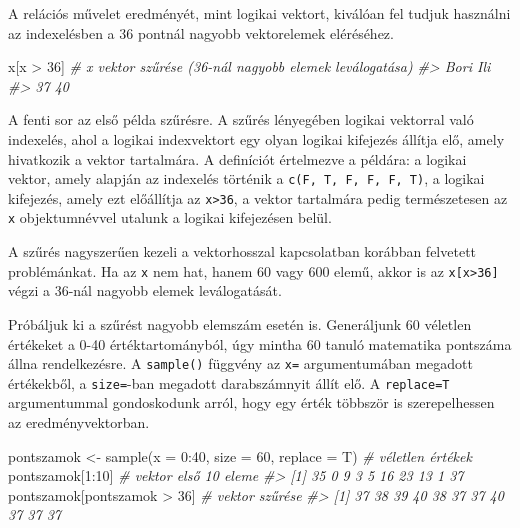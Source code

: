 \documentclass[
]{book}
\newenvironment{Shaded}{\begin{snugshade}}{\end{snugshade}}
\newcommand{\AttributeTok}[1]{\textcolor[rgb]{0.77,0.63,0.00}{#1}}
\newcommand{\CommentTok}[1]{\textcolor[rgb]{0.56,0.35,0.01}{\textit{#1}}}
\newcommand{\DecValTok}[1]{\textcolor[rgb]{0.00,0.00,0.81}{#1}}
\newcommand{\FunctionTok}[1]{\textcolor[rgb]{0.00,0.00,0.00}{#1}}
\newcommand{\NormalTok}[1]{#1}
\newcommand{\OtherTok}[1]{\textcolor[rgb]{0.56,0.35,0.01}{#1}}
\newcommand{\SpecialCharTok}[1]{\textcolor[rgb]{0.00,0.00,0.00}{#1}}
\begin{document}
A relációs művelet eredményét, mint logikai vektort, kiválóan fel tudjuk használni az indexelésben a 36 pontnál nagyobb vektorelemek eléréséhez.

\begin{Shaded}
\begin{Highlighting}[]
\NormalTok{x[x }\SpecialCharTok{\textgreater{}} \DecValTok{36}\NormalTok{]       }\CommentTok{\# x vektor szűrése (36{-}nál nagyobb elemek leválogatása)}
\CommentTok{\#\textgreater{} Bori  Ili }
\CommentTok{\#\textgreater{}   37   40}
\end{Highlighting}
\end{Shaded}

A fenti sor az első példa szűrésre. A szűrés lényegében logikai vektorral való indexelés, ahol a logikai indexvektort egy olyan logikai kifejezés állítja elő, amely hivatkozik a vektor tartalmára. A definíciót értelmezve a példára: a logikai vektor, amely alapján az indexelés történik a \texttt{c(F,\ T,\ F,\ F,\ F,\ T)}, a logikai kifejezés, amely ezt előállítja az \texttt{x\textgreater{}36}, a vektor tartalmára pedig természetesen az \texttt{x} objektumnévvel utalunk a logikai kifejezésen belül.

A szűrés nagyszerűen kezeli a vektorhosszal kapcsolatban korábban felvetett problémánkat. Ha az \texttt{x} nem hat, hanem 60 vagy 600 elemű, akkor is az \texttt{x{[}x\textgreater{}36{]}} végzi a 36-nál nagyobb elemek leválogatását.

Próbáljuk ki a szűrést nagyobb elemszám esetén is. Generáljunk 60 véletlen értékeket a 0-40 értéktartományból, úgy mintha 60 tanuló matematika pontszáma állna rendelkezésre. A \texttt{sample()} függvény az \texttt{x=} argumentumában megadott értékekből, a \texttt{size=}-ban megadott darabszámnyit állít elő. A \texttt{replace=T} argumentummal gondoskodunk arról, hogy egy érték többször is szerepelhessen az eredményvektorban.

\begin{Shaded}
\begin{Highlighting}[]
\NormalTok{pontszamok }\OtherTok{\textless{}{-}} \FunctionTok{sample}\NormalTok{(}\AttributeTok{x =} \DecValTok{0}\SpecialCharTok{:}\DecValTok{40}\NormalTok{, }\AttributeTok{size =} \DecValTok{60}\NormalTok{, }\AttributeTok{replace =}\NormalTok{ T) }\CommentTok{\# véletlen értékek}
\NormalTok{pontszamok[}\DecValTok{1}\SpecialCharTok{:}\DecValTok{10}\NormalTok{]               }\CommentTok{\# vektor első 10 eleme}
\CommentTok{\#\textgreater{}  [1] 35  0  9  3  5 16 23 13  1 37}
\NormalTok{pontszamok[pontszamok }\SpecialCharTok{\textgreater{}} \DecValTok{36}\NormalTok{]    }\CommentTok{\# vektor szűrése}
\CommentTok{\#\textgreater{}  [1] 37 38 39 40 38 37 37 40 37 37 37}
\end{Highlighting}
\end{Shaded}
\end{document}
